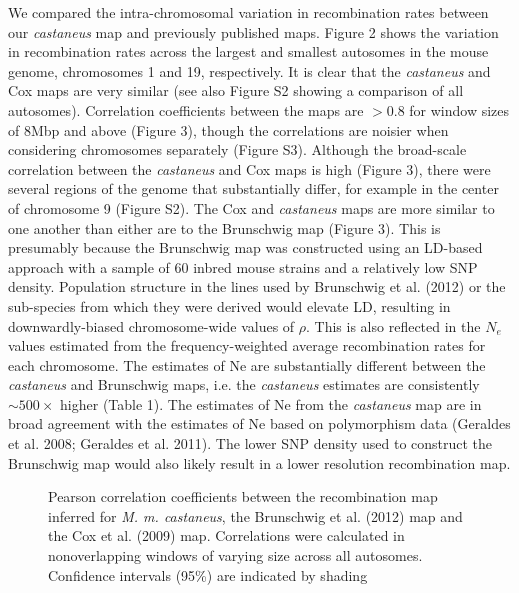 We compared the intra-chromosomal variation in recombination rates between our \textit{castaneus} map and previously published maps. Figure 2 shows the variation in recombination rates across the largest and smallest autosomes in the mouse genome, chromosomes 1 and 19, respectively. It is clear that the \textit{castaneus} and Cox maps are very similar (see also Figure S2 showing a comparison of all autosomes). Correlation coefficients between the maps are $>$0.8 for window sizes of 8Mbp and above (Figure 3), though the correlations are noisier when considering chromosomes separately (Figure S3). Although the broad-scale correlation between the \textit{castaneus} and Cox maps is high (Figure 3), there were several regions of the genome that substantially differ, for example in the center of chromosome 9 (Figure S2). The Cox and \textit{castaneus} maps are more similar to one another than either are to the Brunschwig map (Figure 3). This is presumably because the Brunschwig map was constructed using an LD-based approach with a sample of 60 inbred mouse strains and a relatively low SNP density. Population structure in the lines used by Brunschwig et al. (2012) or the sub-species from which they were derived would elevate LD, resulting in downwardly-biased chromosome-wide values of $\rho$. This is also reflected in the $N_e$ values estimated from the frequency-weighted average recombination rates for each chromosome. The estimates of Ne are substantially different between the \textit{castaneus} and Brunschwig maps, i.e. the \textit{castaneus} estimates are consistently $\sim500\times$ higher (Table 1). The estimates of Ne from the \textit{castaneus} map are in broad agreement with the estimates of Ne based on polymorphism data (Geraldes et al. 2008; Geraldes et al. 2011). The lower SNP density used to construct the Brunschwig map would also likely result in a lower resolution recombination map.

\linespread{1}
\begin{figure}[h]
   \centering      
   \noindent{}
 \caption[Broad-scale correlations between recombiantion maps for \emph{Mus musculus castaneus} and \emph{Mus musculus domesticus}]{Pearson correlation coefficients between the recombination map inferred for \emph{M. m. castaneus}, the Brunschwig et al. (2012) map and the Cox et al. (2009) map. Correlations were calculated in nonoverlapping windows of varying size across all autosomes. Confidence intervals (95\%) are indicated by shading}
\end{figure}
\linespread{2}

